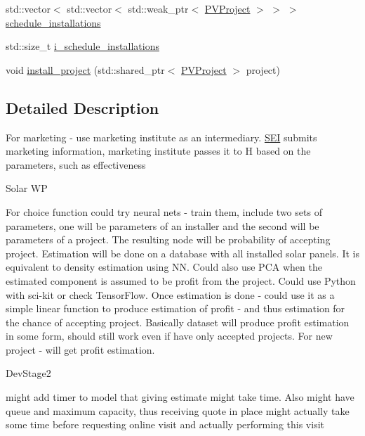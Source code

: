 \begin{DoxyCompactItemize}
\item 
std\+::vector$<$ std\+::vector$<$ std\+::weak\+\_\+ptr$<$ \hyperlink{classsolar__core_1_1_p_v_project}{P\+V\+Project} $>$ $>$ $>$ \hyperlink{classsolar__core_1_1_s_e_i_aacda4fae2c17d58672b60eba9c8cdc63}{schedule\+\_\+installations}
\item 
std\+::size\+\_\+t \hyperlink{classsolar__core_1_1_s_e_i_ad906dcd5b638e405a7daf14539096377}{i\+\_\+schedule\+\_\+installations}
\item 
void \hyperlink{classsolar__core_1_1_s_e_i_a1ab2217b83050e4320afa11c4d838fde}{install\+\_\+project} (std\+::shared\+\_\+ptr$<$ \hyperlink{classsolar__core_1_1_p_v_project}{P\+V\+Project} $>$ project)
\end{DoxyCompactItemize}


\subsection{Detailed Description}
For marketing -\/ use marketing institute as an intermediary. \hyperlink{classsolar__core_1_1_s_e_i}{S\+E\+I} submits marketing information, marketing institute passes it to H based on the parameters, such as effectiveness

\begin{DoxyRefDesc}{Solar W\+P}
\item[\hyperlink{wp__wp000004}{Solar W\+P}]For choice function could try neural nets -\/ train them, include two sets of parameters, one will be parameters of an installer and the second will be parameters of a project. The resulting node will be probability of accepting project. Estimation will be done on a database with all installed solar panels. It is equivalent to density estimation using N\+N. Could also use P\+C\+A when the estimated component is assumed to be profit from the project. Could use Python with sci-\/kit or check Tensor\+Flow. Once estimation is done -\/ could use it as a simple linear function to produce estimation of profit -\/ and thus estimation for the chance of accepting project. Basically dataset will produce profit estimation in some form, should still work even if have only accepted projects. For new project -\/ will get profit estimation.\end{DoxyRefDesc}


\begin{DoxyRefDesc}{Dev\+Stage2}
\item[\hyperlink{_dev_stage2__DevStage2000017}{Dev\+Stage2}]might add timer to model that giving estimate might take time. Also might have queue and maximum capacity, thus receiving quote in place might actually take some time before requesting online visit and actually performing this visit\end{DoxyRefDesc}


